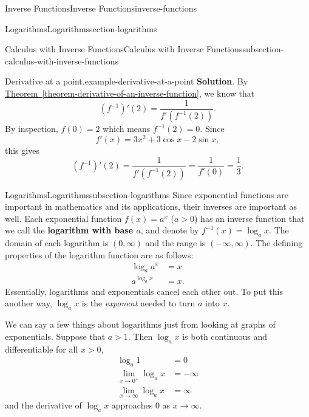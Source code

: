 \documentclass[oneside,10pt,]{book}
\newcommand{\terminology}[1]{\textbf{#1}}
\numberwithin{equation}{section}
\begin{document}
\begin{chapterptx}{Inverse Functions}{}{Inverse Functions}{}{}{inverse-functions}
\begin{sectionptx}{Logarithms}{}{Logarithms}{}{}{section-logarithms}
\begin{subsectionptx}{Calculus with Inverse Functions}{}{Calculus with Inverse Functions}{}{}{subsection-calculus-with-inverse-functions}
\begin{example}{Derivative at a point.}{example-derivative-at-a-point}
\noindent\textbf{Solution}.\hypertarget{solution-47}{}\quad%
\hypertarget{p-216}{}%
By \hyperref[theorem-derivative-of-an-inverse-function]{Theorem~\ref{theorem-derivative-of-an-inverse-function}}, we know that%
\begin{equation*}
(f^{-1})'(2) = \frac{1}{f'(f^{-1}(2))}.
\end{equation*}
By inspection, \(f(0) = 2\) which means \(f^{-1}(2) = 0\). Since%
\begin{equation*}
f'(x) = 3x^{2} + 3\cos x - 2\sin x,
\end{equation*}
this gives%
\begin{equation*}
(f^{-1})'(2) = \frac{1}{f'(f^{-1}(2))} = \frac{1}{f'(0)} = \frac{1}{3}.
\end{equation*}
%
\end{example}
\end{subsectionptx}
%
%
\typeout{************************************************}
\typeout{************************************************}
%
\begin{subsectionptx}{Logarithms}{}{Logarithms}{}{}{subsection-logarithms}
\hypertarget{p-217}{}%
Since exponential functions are important in mathematics and its applications, their inverses are important as well. Each exponential function \(f(x) = a^{x}\) (\(a> 0\)) has an inverse function that we call the \terminology{logarithm with base \(a\)}, and denote by \(f^{-1}(x) = \log_{a}x\). The domain of each logarithm is \((0,\infty)\) and the range is \((-\infty,\infty)\). The defining properties of the logarithm function are as follows:%
\begin{align*}
\log_{a}a^{x} & = x \\
a^{\log_{a}x} & = x. 
\end{align*}
Essentially, logarithms and exponentials cancel each other out. To put this another way, \(\log_{a}x\) is the \emph{exponent} needed to turn \(a\) into \(x\).%
\par
\hypertarget{p-218}{}%
We can say a few things about logarithms just from looking at graphs of exponentials. Suppose that \(a>1\). Then \(\log_{a}x\) is both continuous and differentiable for all \(x>0\),%
\begin{align*}
\log_{a}1 & = 0 \\
\lim_{x\to0^{+}}\log_{a}x & = -\infty \\
\lim_{x\to\infty}\log_{a}x & = \infty 
\end{align*}
and the derivative of \(\log_{a}x\) approaches \(0\) as \(x\to\infty\).%

\end{subsectionptx}
\end{sectionptx}
\end{chapterptx}
\end{document}
